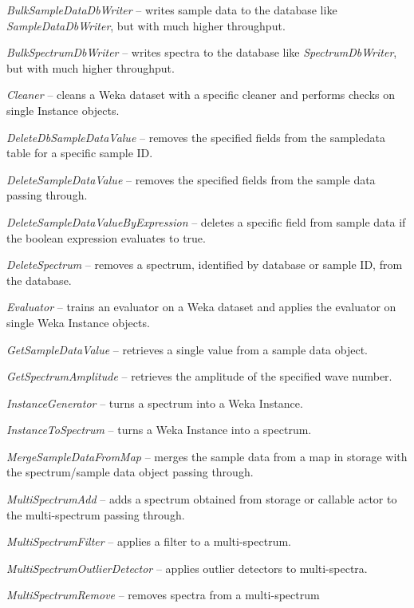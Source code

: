 \documentclass[a4paper]{book}
\begin{document}
\begin{tight_itemize}
  \item \textit{BulkSampleDataDbWriter} -- writes sample data to the database like \textit{SampleDataDbWriter}, but
  with much higher throughput.
  \item \textit{BulkSpectrumDbWriter} -- writes spectra to the database like \textit{SpectrumDbWriter}, but
  with much higher throughput.
  \item \textit{Cleaner} -- cleans a Weka dataset with a specific cleaner
  and performs checks on single Instance objects.
  \item \textit{DeleteDbSampleDataValue} -- removes the specified fields
  from the sampledata table for a specific sample ID.
  \item \textit{DeleteSampleDataValue} -- removes the specified fields
  from the sample data passing through.
  \item \textit{DeleteSampleDataValueByExpression} -- deletes a specific
  field from sample data if the boolean expression evaluates to true.
  \item \textit{DeleteSpectrum} -- removes a spectrum, identified by
  database or sample ID, from the database.
  \item \textit{Evaluator} -- trains an evaluator on a Weka dataset and
  applies the evaluator on single Weka Instance objects.
  \item \textit{GetSampleDataValue} -- retrieves a single value from a
  sample data object.
  \item \textit{GetSpectrumAmplitude} -- retrieves the amplitude of the
  specified wave number.
  \item \textit{InstanceGenerator} -- turns a spectrum into a Weka Instance.
  \item \textit{InstanceToSpectrum} -- turns a Weka Instance into a spectrum.
  \item \textit{MergeSampleDataFromMap} -- merges the sample data from a map in storage
  with the spectrum/sample data object passing through.
  \item \textit{MultiSpectrumAdd} -- adds a spectrum obtained from storage or
  callable actor to the multi-spectrum passing through.
  \item \textit{MultiSpectrumFilter} -- applies a filter to a multi-spectrum.
  \item \textit{MultiSpectrumOutlierDetector} -- applies outlier detectors
  to multi-spectra.
  \item \textit{MultiSpectrumRemove} -- removes spectra from a multi-spectrum

\end{tight_itemize}
\end{document}
